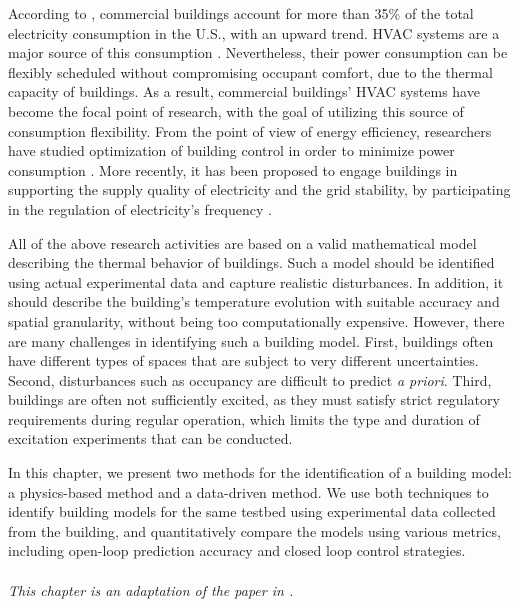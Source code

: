 \documentclass[../../thesis.tex]{subfiles}
\begin{document}
According to \cite{Perez-Lombard:2008aa}, commercial buildings account for more than 35\% of the total electricity consumption in the U.S., with an upward trend. HVAC systems are a major source of this consumption \cite{USenergy:2017}. %
Nevertheless, their power consumption can be flexibly scheduled without compromising occupant comfort, due to the thermal capacity of buildings. 
As a result, commercial buildings' HVAC systems have become the focal point of research, with the goal of utilizing this source of consumption flexibility. From the point of view of energy efficiency, researchers have studied optimization of building control in order to minimize power consumption \cite{Siroky:2011aa, Parisio:2014aa}.  
More recently, it has been proposed to engage buildings in supporting the supply quality of electricity and the grid stability, by participating in the regulation of electricity's frequency \cite{Balandat:2014contractdesign, Lin:2015exp, Vrettos:2014aggregation, Baccino:2014aa}.


All of the above research activities are based on a valid mathematical model describing the thermal behavior of buildings.  
Such a model should be identified using actual experimental data and capture realistic disturbances. 
In addition, it should describe the building's temperature evolution with suitable accuracy and spatial granularity, without being too computationally expensive.
However, there are many challenges in identifying such a building model. 
First, buildings often have different types of spaces that are subject to very different uncertainties. 
Second, disturbances such as occupancy are difficult to predict \textit{a priori}. 
Third, buildings are often not sufficiently excited, as they must satisfy strict regulatory requirements during regular operation, which limits the type and duration of excitation experiments that can be conducted.  

In this chapter, we present two methods for the identification of a building model: a physics-based method and a data-driven method. 
We use both techniques to identify building models for the same testbed using experimental data collected from the building, and quantitatively compare the models using various metrics, including open-loop prediction accuracy and closed loop control strategies. 
\\
\\
\noindent
\textit{This chapter is an adaptation of the paper in \cite{Zhou:2017modelcomp}.}







\end{document}
